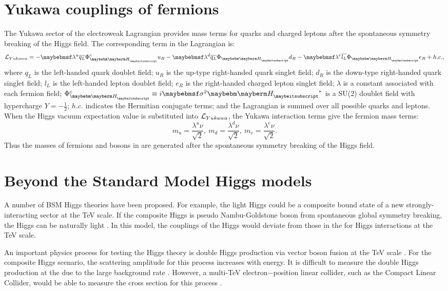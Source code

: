 \section{Yukawa couplings of fermions}

The Yukawa sector of the electroweak Lagrangian provides mass terms for quarks and charged leptons after the spontaneous symmetry breaking of the Higgs field. The  corresponding term in the Lagrangian is:
\begin{equation}
\Lagr_{Yukawa} = -\lambda^{u}\overline{q_L}\Phi_{\PH}^{c}u_R  - \lambda^{d}\overline{q_L}\Phi_{\PH}{d}_R - \lambda^{e}\overline{l_L}\Phi_{\PH}e_R + h.c. ,
\end{equation}
where $q_L$ is the left-handed quark doublet field; $u_R$ is the up-type right-handed quark singlet field;  $d_R$ is the down-type right-handed quark singlet field; $l_L$ is the left-handed lepton doublet field; $e_R$ is the right-handed charged lepton singlet field; $\lambda$ is a constant associated with each fermion field; $\Phi_{\PH}^{c} \equiv i \sigma^2{\PH}^*$ is a SU(2) doublet field with hypercharge $Y = -\frac{1}{2}$; $h.c.$ indicates the Hermitian conjugate terms; and the Lagrangian is summed over all possible quarks and leptons. When the Higgs vacuum expectation value is substituted into $\operatorname{\mathcal{L}}_{Yukawa}$, the Yukawa interaction terms give the fermion mass terms:
\begin{equation}
m_{u} = \frac{\lambda^u{\nu}}{\sqrt{2}},\ m_{d} = \frac{\lambda^d{\nu}}{\sqrt{2}},\ m_{e} = \frac{\lambda^e{\nu}}{\sqrt{2}}.
\end{equation}
Thus the masses of fermions and bosons in \SM are generated after  the spontaneous symmetry breaking of the Higgs field.

\section{Beyond the Standard Model Higgs models}
\label{sec:theoryHiggsBSM}

A number of BSM Higgs theories have been proposed. For example, the light Higgs could be a composite bound state of a new strongly-interacting sector at the TeV scale. If the composite Higgs is  pseudo Nambu-Goldstone boson from spontaneous global symmetry breaking, the Higgs can be naturally light \cite{Kaplan:1983fs}.  In this model, the couplings of the Higgs would deviate from those in the \SM for  Higgs interactions at the TeV scale.


An important physics process for testing the Higgs theory is  double Higgs production via vector boson fusion at the TeV scale \cite{Giudice:2007fh,Contino:2010mh,Contino:2013gna}. For the composite Higgs scenario, the scattering amplitude for this process increases with energy. It is difficult  to measure the double Higgs production at the \LHC due to the large \SM background rate \cite{Contino:2010mh}. However, a multi-TeV electron$-$position linear collider, such as the Compact Linear Collider, would be able to measure the cross section for  this process \cite{Barger:2003rs}.


